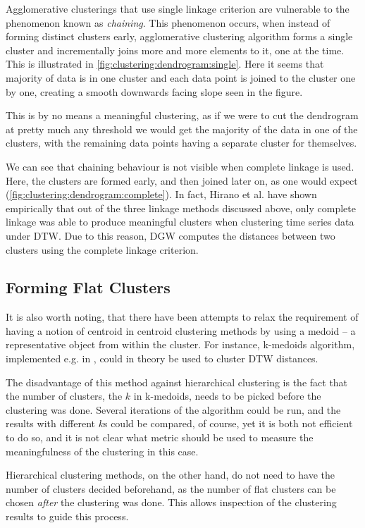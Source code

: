 \documentclass[parskip]{cs4rep}
\begin{document}
Agglomerative clusterings that use single linkage criterion are vulnerable to the phenomenon known as \emph{chaining}. This phenomenon occurs, when instead of forming distinct clusters early, agglomerative clustering algorithm forms a single cluster and incrementally joins more and more elements to it, one at the time. This is illustrated in \autoref{fig:clustering:dendrogram:single}. 
Here it seems that majority of data is in one cluster and each data point is joined to the cluster one by one, creating a smooth downwards facing slope seen in the figure. 

This is by no means a meaningful clustering, as 
if we were to cut the dendrogram at pretty much any threshold we would get the majority of the data in one of the clusters, with the remaining data points having a separate cluster for themselves. 

We can see that chaining behaviour is not visible when complete linkage is used. Here, the clusters are formed early, and then joined later on, as one would expect (\autoref{fig:clustering:dendrogram:complete}). In fact, Hirano et al. \cite{Hirano:2005wh} have shown empirically that out of the three linkage methods discussed above, only complete linkage was able to produce meaningful clusters when clustering time series data under DTW. Due to this reason, DGW computes the distances between two clusters using the complete linkage criterion.

\subsection{Forming Flat Clusters}

It is also worth noting, that there have been attempts to relax the requirement of having a notion of centroid in centroid clustering methods by using a medoid -- a representative object from within the cluster. For instance, k-medoids algorithm, implemented e.g. in \cite{Park:2009ks}, could in theory be used to cluster DTW distances. 

The disadvantage of this method against hierarchical clustering is the fact that the number of clusters, the $k$ in k-medoids, needs to be picked before the clustering was done. Several iterations of the algorithm could be run, and the results with different $k$s could be compared, of course, yet it is both not efficient to do so, and it is not clear what metric should be used to
measure the meaningfulness of the clustering in this case.

Hierarchical clustering methods, on the other hand, do not need to have the number of clusters decided beforehand, as the number of flat clusters can be chosen \emph{after} the clustering was done. This
allows inspection of the clustering results to guide this process.
\end{document}
